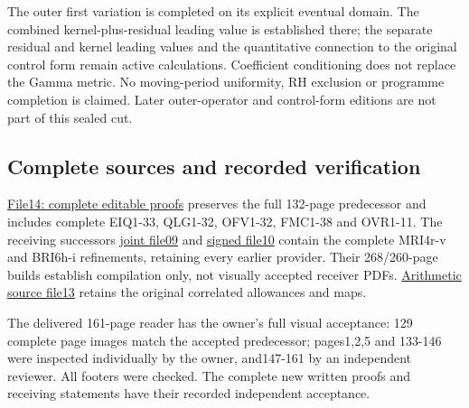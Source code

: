 \documentclass[
]{article}
\begin{document}
The outer first variation is completed on its explicit eventual domain.
The combined kernel-plus-residual leading value is established there;
the separate residual and kernel leading values and the quantitative
connection to the original control form remain active calculations.
Coefficient conditioning does not replace the Gamma metric. No
moving-period uniformity, RH exclusion or programme completion is
claimed. Later outer-operator and control-form editions are not part of
this sealed cut.

\subsection{Complete sources and recorded
verification}\label{complete-sources-and-recorded-verification}

\href{https://github.com/KokunoYumeto/zeta-function-research-reader/blob/af5c17948c24f43494ea76d823322e8b3924b58d/workbenches/splitzero-tandem/continuations/20260915-first-variation-continuation/14_CURRENT_KERNEL_AND_MULTIPLICITY_PROOFS.tex}{File14:
complete editable proofs} preserves the full 132-page predecessor and
includes complete EIQ1-33, QLG1-32, OFV1-32, FMC1-38 and OVR1-11. The
receiving successors
\href{https://github.com/KokunoYumeto/zeta-function-research-reader/blob/af5c17948c24f43494ea76d823322e8b3924b58d/workbenches/splitzero-tandem/continuations/20260915-first-variation-continuation/09_UPDATED_JOINT_NOTE.tex}{joint
file09} and
\href{https://github.com/KokunoYumeto/zeta-function-research-reader/blob/af5c17948c24f43494ea76d823322e8b3924b58d/workbenches/splitzero-tandem/continuations/20260915-first-variation-continuation/10_UPDATED_SIGNED_RETURN.tex}{signed
file10} contain the complete MRI4r-v and BRI6h-i refinements, retaining
every earlier provider. Their 268/260-page builds establish compilation
only, not visually accepted receiver PDFs.
\href{https://github.com/KokunoYumeto/zeta-function-research-reader/blob/af5c17948c24f43494ea76d823322e8b3924b58d/workbenches/splitzero-tandem/continuations/20260915-first-variation-continuation/13_ARITHMETIC_MIXED_TRANSFER.tex}{Arithmetic
source file13} retains the original correlated allowances and maps.

The delivered 161-page reader has the owner's full visual acceptance:
129 complete page images match the accepted predecessor; pages1,2,5 and
133-146 were inspected individually by the owner, and147-161 by an
independent reviewer. All footers were checked. The complete new written
proofs and receiving statements have their recorded independent
acceptance.
\end{document}
